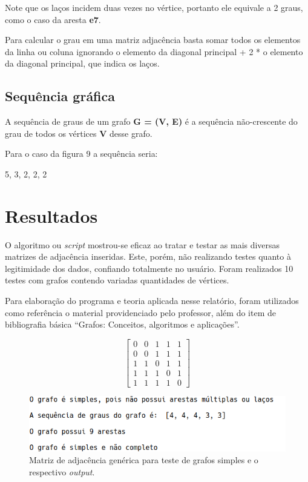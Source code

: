 \documentclass[a4paper, 12pt]{article}
\begin{document}
    Note que os laços incidem duas vezes no vértice, portanto ele equivale a 2 graus, como o caso da aresta \textbf{e7}.
    
    \indent Para calcular o grau em uma matriz adjacência basta somar todos os elementos da linha ou coluna ignorando o elemento da diagonal principal + 2 * o elemento da diagonal principal, que indica os laços.
    
\subsection{Sequência gráfica}

    A sequência de graus de um grafo \textbf{G = (V, E)} é a sequência não-crescente do grau de todos os vértices \textbf{V} desse grafo. 
    
    \indent Para o caso da figura 9 a sequência seria:
    
    \begin{center}
     5, 3, 2, 2, 2
    \end{center}

\section{Resultados}

O algoritmo ou \textit{script} mostrou-se eficaz ao tratar e testar as mais diversas matrizes de adjacência inseridas. Este, porém, não realizando testes quanto à legitimidade dos dados, confiando totalmente no usuário. Foram realizados 10 testes com grafos contendo variadas quantidades de vértices.

Para elaboração do programa e teoria aplicada nesse relatório, foram utilizados como referência o material providenciado pelo professor, além do item de bibliografia básica ``Grafos: Conceitos, algoritmos e aplicações''. 

\begin{figure}[hbt!]
\begin{multicols}{2}
	\[
	\begin{bmatrix}
	0	&0	&1 	&1	&1\\
	0	&0	&1	&1 	&1\\
	1	&1	&0	&1  	&1\\
	1	&1	&1	&0	&1\\
	1	&1	&1	&1	&0

\end{bmatrix} \]

\includegraphics[width=\linewidth]{outputprog.png}
\end{multicols}
\caption{Matriz de adjacência genérica para teste de grafos simples e o respectivo \textit{output}. }
\end{figure}
\end{document}
